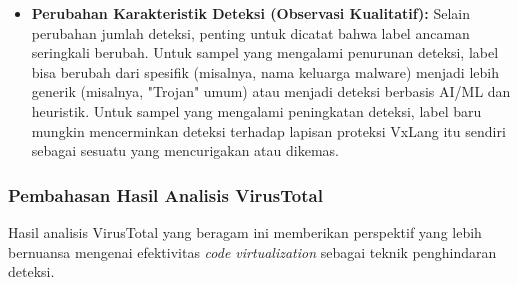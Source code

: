 \begin{itemize}
    \item \textbf{Perubahan Karakteristik Deteksi (Observasi Kualitatif):} Selain perubahan jumlah deteksi, penting untuk dicatat bahwa label ancaman seringkali berubah. Untuk sampel yang mengalami penurunan deteksi, label bisa berubah dari spesifik (misalnya, nama keluarga malware) menjadi lebih generik (misalnya, "Trojan" umum) atau menjadi deteksi berbasis AI/ML dan heuristik. Untuk sampel yang mengalami peningkatan deteksi, label baru mungkin mencerminkan deteksi terhadap lapisan proteksi VxLang itu sendiri sebagai sesuatu yang mencurigakan atau dikemas.
\end{itemize}

\subsubsection{Pembahasan Hasil Analisis VirusTotal}
Hasil analisis VirusTotal yang beragam ini memberikan perspektif yang lebih bernuansa mengenai efektivitas \textit{code virtualization} sebagai teknik penghindaran deteksi.
